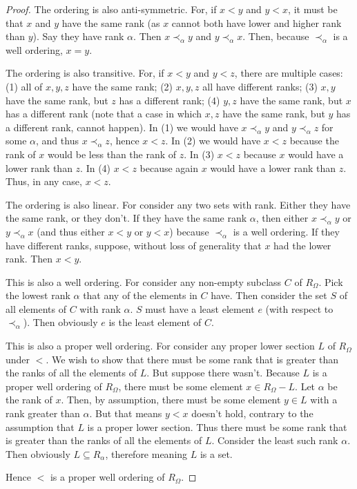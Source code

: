 \documentclass{article}
\theoremstyle{definition}
\begin{document}
\begin{proof}
	The ordering is also anti-symmetric. For, if $x<y$ and $y<x$, it must be that $x$ and $y$ have the same rank (as $x$ cannot both have 
lower and higher rank than $y$). Say they have rank $\alpha$. Then $x\prec_\alpha y$ and $y\prec_\alpha x$. Then, because 
$\prec_\alpha$ is a well ordering, $x=y$.

	The ordering is also transitive. For, if $x<y$ and $y<z$, there are multiple cases: (1) all of $x,y,z$ have the same rank; 
(2) $x,y,z$ all have different ranks; (3) $x,y$ have the same rank, but $z$ has a different rank; (4) $y,z$ have the same rank, 
but $x$ has a different rank (note that a case in which $x,z$ have the same rank, but $y$ has a different rank, cannot happen). In 
(1) we would have $x\prec_\alpha y$ and $y\prec_\alpha z$ for some $\alpha$, and thus $x\prec_\alpha z$, hence $x<z$. In (2) we would have 
$x<z$ because the rank of $x$ would be less than the rank of $z$. In (3) $x<z$ because $x$ would have a lower rank than $z$. In (4) 
$x<z$ because again $x$ would have a lower rank than $z$. Thus, in any case, $x<z$.

	The ordering is also linear. For consider any two sets with rank. Either they have the same rank, or they don't. If they have the 
same rank $\alpha$, then either $x\prec_\alpha y$ or $y\prec_\alpha x$ (and thus either $x<y$ or $y<x$) because $\prec_\alpha$ is a well ordering. 
If they have different ranks, suppose, without loss of generality that $x$ had the lower rank. Then $x<y$.
	
	This is also a well ordering. For consider any non-empty subclass $C$ of $R_\Omega$. Pick the lowest rank $\alpha$ that any of the elements in $C$ have. 
Then consider the set $S$ of all elements of $C$ with rank $\alpha$. $S$ must have a least element $e$ (with respect to $\prec_\alpha$). Then obviously 
$e$ is the least element of $C$.

	This is also a proper well ordering. For consider any proper lower section $L$ of $R_\Omega$ under $<$. We wish to show that there must be some rank 
that is greater than the ranks of all the elements of $L$. But suppose there wasn't. Because $L$ is a proper well ordering of $R_\Omega$, there must be some element 
$x\in R_\Omega-L$. Let $\alpha$ be the rank of $x$. Then, by assumption, there must be some element $y\in L$ with a rank greater than $\alpha$. But that means 
$y<x$ doesn't hold, contrary to the assumption that $L$ is a proper lower section. Thus there must be some rank that is greater than the ranks of all the 
elements of $L$. Consider the least such rank $\alpha$. Then obviously $L\subseteq R_\alpha$, therefore meaning $L$ is a set.

	Hence $<$ is a proper well ordering of $R_\Omega$.
\end{proof}
\end{document}
